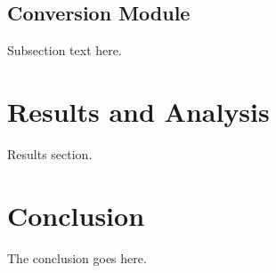 \documentclass[10pt,conference]{IEEEtran}
\begin{document}
\subsection{Conversion Module}
Subsection text here.


%


\section{Results and Analysis}
Results section.

\section{Conclusion}
The conclusion goes here.

\end{document}
